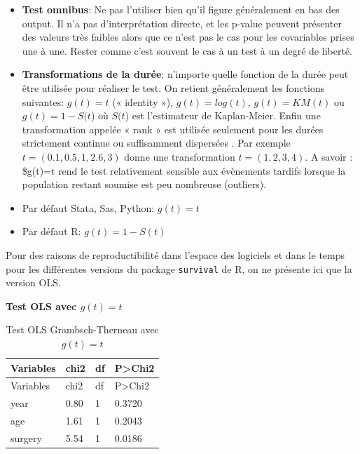 \documentclass[
  12pt,
  letterpaper,
  DIV=11,
  numbers=noendperiod,
  onepage,
  openany]{scrreprt}
\begin{document}
\begin{tcolorbox}[enhanced jigsaw, arc=.35mm, bottomrule=.15mm, titlerule=0mm, colbacktitle=quarto-callout-warning-color!10!white, left=2mm, opacitybacktitle=0.6, toprule=.15mm, title=\textcolor{quarto-callout-warning-color}{\faExclamationTriangle}\hspace{0.5em}{Avertissement}, colframe=quarto-callout-warning-color-frame, breakable, coltitle=black, opacityback=0, toptitle=1mm, bottomtitle=1mm, rightrule=.15mm, leftrule=.75mm, colback=white]

\begin{itemize}
\item
  \textbf{Test omnibus}: Ne pas l'utiliser bien qu'il figure
  généralement en bas des output. Il n'a pas d'interprétation directe,
  et les p-value peuvent présenter des valeurs très faibles alors que ce
  n'est pas le cas pour les covariables prises une à une. Rester comme
  c'est souvent le cas à un test à un degré de liberté.
\item
  \textbf{Transformations de la durée}: n'importe quelle fonction de la
  durée peut être utilisée pour réaliser le test. On retient
  généralement les fonctions suivantes: \(g(t)=t\) (« identity »),
  \(g(t)=log(t)\), \(g(t)=KM(t)\) ou \(g(t)=1- S(t\)) où \(S(t\)) est
  l'estimateur de Kaplan-Meier. Enfin une transformation appelée « rank
  » est utilisée seulement pour les durées strictement continue ou
  suffisamment dispersées . Par exemple \(t=(0.1,0.5,1,2.6,3)\) donne
  une transformation \(t=(1,2,3,4)\). A savoir : \$g(t)=t rend le test
  relativement sensible aux évènements tardifs lorsque la population
  restant soumise est peu nombreuse (outliers).
\item
  Par défaut Stata, Sas, Python: \(g(t)=t\)
\item
  Par défaut R: \(g(t)= 1 - S(t)\)
\end{itemize}

\end{tcolorbox}

Pour des raisons de reproductibilité dans l'espace des logiciels et dans
le temps pour les différentes versions du package \texttt{survival} de
R, on ne présente ici que la version OLS.

\textbf{Test OLS avec \(g(t)=t\)}

\begin{longtable}[]{@{}llll@{}}
\caption{Test OLS Grambsch-Therneau avec \(g(t)=t\)}\tabularnewline
\toprule\noalign{}
Variables & chi2 & df & P\textgreater Chi2 \\
\midrule\noalign{}
\endfirsthead
\toprule\noalign{}
Variables & chi2 & df & P\textgreater Chi2 \\
\midrule\noalign{}
\endhead
\bottomrule\noalign{}
\endlastfoot
year & 0.80 & 1 & 0.3720 \\
age & 1.61 & 1 & 0.2043 \\
surgery & 5.54 & 1 & 0.0186 \\
\end{longtable}
\end{document}
